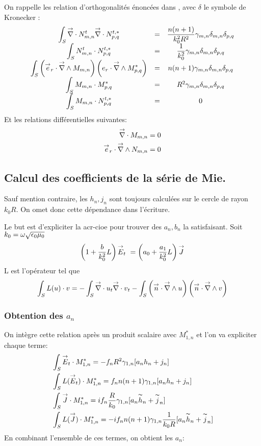On rappelle les relation d'orthogonalités énoncées dans \cite{marceaux_high-order_2000}, avec \(\delta\) le symbole de Kronecker :
\[
  \begin{matrix}
    \displaystyle\int_S {\overset{\rightarrow}{\nabla}}\cdot N_{m,n}^t {\overset{\rightarrow}{\nabla}}\cdot N_{p,q}^{t,*} &=& \dfrac{n(n+1)}{k_0^2 R^2} \gamma_{m,n} \delta_{m,n} \delta_{p,q}\\
    \displaystyle\int_S N_{m,n}^t \cdot N_{p,q}^{t,*} &=& \dfrac{1}{k_0^2}\gamma_{m,n}\delta_{m,n} \delta_{p,q}\\
    \displaystyle\int_S \left({\overset{\rightarrow}{e}}_r \cdot {\overset{\rightarrow}{\nabla}}\wedge M_{m,n}\right)\left( e_r \cdot {\overset{\rightarrow}{\nabla}}\wedge  M_{p,q}^{*}\right) &=& n(n+1) \gamma_{m,n} \delta_{m,n} \delta_{p,q}\\
    \displaystyle\int_S M_{m,n} \cdot M_{p,q}^{*} &=& R^2 \gamma_{m,n} \delta_{m,n} \delta_{p,q}\\
    \displaystyle\int_S M_{m,n} \cdot N_{p,q}^{t,*} &=& 0
  \end{matrix}
\]
Et les relations différentielles suivantes:
\begin{align*}
  {\overset{\rightarrow}{\nabla}}\cdot M_{m,n} &=0 \\
  {\overset{\rightarrow}{e}}_r \cdot {\overset{\rightarrow}{\nabla}}\wedge N_{m,n} &= 0
\end{align*}

\subsection{Calcul des coefficients de la série de Mie.}
\begin{tcolorbox}
Sauf mention contraire, les \(h_n,j_n\) sont toujours calculées sur le cercle de rayon \(k_0R\). On omet donc cette dépendance dans l'écriture.
\end{tcolorbox}
Le but est d'expliciter la \gls{acr-cioe} pour trouver des \(a_n, b_n\) la satisfaisant.
Soit \(k_0 = \omega\sqrt{\epsilon_0\mu_0}\)
\begin{equation}
  \label{eq:CIOE} \left(1+\dfrac{b}{k_0^2}L\right){\overset{\rightarrow}{E}}_t\ = \left(a_0 + \dfrac{a_1}{k_0^2}L\right){\overset{\rightarrow}{J}}
\end{equation}
L est l'opérateur tel que 
\[
  \int_{S} L(u)\cdot v = - \int_{S} {{\overset{\rightarrow}{\nabla}}\cdot u}_t {{\overset{\rightarrow}{\nabla}}\cdot v}_t - \int_{S}\left({\overset{\rightarrow}{n}} \cdot {\overset{\rightarrow}{\nabla}}\wedge u\right)\left( {\overset{\rightarrow}{n}} \cdot {\overset{\rightarrow}{\nabla}}\wedge v\right)
\]
\subsubsection{Obtention des \(a_n\)}
On intègre cette relation après un produit scalaire avec \(M_{1,n}^{*}\) et l'on va expliciter chaque terme:
\begin{align*}
  &\int_S {\overset{\rightarrow}{E}}_t\cdot M_{1,n}^{*} = - f_n R^2 \gamma_{1,n}[a_n h_n + j_n]\\
  &\int_S L({\overset{\rightarrow}{E}}_t)\cdot M_{1,n}^{*} =  f_n n(n+1)\gamma_{1,n}[a_n h_n + j_n]\\
  &\int_S {\overset{\rightarrow}{J}} \cdot M_{1,n}^{*} =  i f_n \dfrac{R}{k_0} \gamma_{1,n}[a_n \overset{\thicksim}{h}_n + \overset{\thicksim}{j}_n]\\
  &\int_S L({\overset{\rightarrow}{J}}) \cdot M_{1,n}^{*} =  - i f_n n(n+1) \gamma_{1,n}\dfrac{1}{k_0 R}[a_n \overset{\thicksim}{h}_n + \overset{\thicksim}{j}_n]\\
\end{align*}
En combinant l'ensemble de ces termes, on obtient les \(a_n\):

